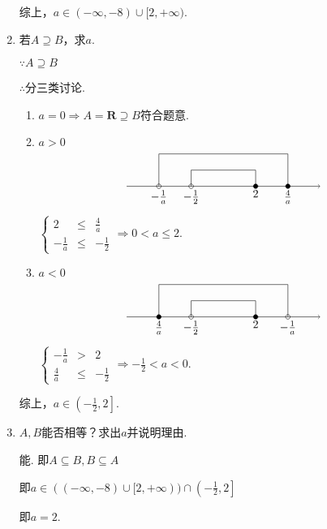 \documentclass[8pt]{article}
\begin{document}
\begin{enumerate}[label=$(\arabic*)$]
						综上，$a\in(-\infty, -8)\cup[2, +\infty).$

					\item 若$A\supseteq B$，求$a$.

						$\because A\supseteq B$

						$\therefore$分三类讨论.

						\begin{enumerate}[label=$\arabic*^{\circ}$]
							\item $a=0\Rightarrow A=\mathbf{R}\supseteq B$符合题意.

							\item $a>0$
								$$
									\begin{tikzpicture} [scale=0.5]
										\draw [black] [->] (-6, 0)--(6, 0);
										\draw [black] (-4, 0) circle (4pt) node[anchor=north] {$-\frac{1}{a}$};
										\filldraw [black] (4, 0) circle (4pt) node[anchor=north] {$\frac{4}{a}$};
										\draw [black] (-2, 0) circle (4pt) node[anchor=north] {$-\frac{1}{2}$};
										\filldraw [black] (2, 0) circle (4pt) node[anchor=north] {$2$};
										\draw [black] (-4, 0)--(-4, 2)--(4, 2)--(4, 0);
										\draw [black] (-2, 0)--(-2, 1)--(2, 1)--(2, 0);
									\end{tikzpicture}
								$$
								$\displaystyle\left\{\begin{array}{rcl}2&\leq&\frac{4}{a}\\-\frac{1}{a}&\leq&-\frac{1}{2}\end{array}\right.\Rightarrow 0<a\leq2.$

							\item $a<0$
								$$
									\begin{tikzpicture} [scale=0.5]
										\draw [black] [->] (-6, 0)--(6, 0);
										\draw [black] (-2, 0) circle (4pt) node[anchor=north] {$-\frac{1}{2}$};
										\filldraw [black] (2, 0) circle (4pt) node[anchor=north] {$2$};
										\filldraw [black] (-4, 0) circle (4pt) node[anchor=north] {$\frac{4}{a}$};
										\draw [black] (4, 0) circle (4pt) node[anchor=north] {$-\frac{1}{a}$};
										\draw [black] (-4, 0)--(-4, 2)--(4, 2)--(4, 0);
										\draw [black] (-2, 0)--(-2, 1)--(2, 1)--(2, 0);
									\end{tikzpicture}
								$$
								$\displaystyle\left\{\begin{array}{rcl}-\frac{1}{a}&>&2\\\frac{4}{a}&\leq&-\frac{1}{2}\end{array}\right.\Rightarrow -\frac{1}{2}<a<0.$
						\end{enumerate}

						综上，$a\in\left(-\frac{1}{2}, 2\right].$

					\item $A, B$能否相等？求出$a$并说明理由.

						能. 即$A\subseteq B, B\subseteq A$

						即$a\in((-\infty, -8)\cup[2, +\infty))\cap\left(-\frac{1}{2}, 2\right]$

						即$a=2.$

				\end{enumerate}
\end{document}
